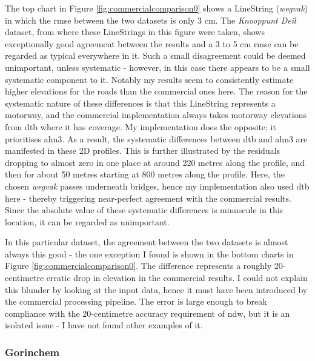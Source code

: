 The top chart in Figure \ref{fig:commercialcomparison0} shows a LineString (\textit{wegvak}) in which the \ac{rmse} between the two datasets is only 3 cm. The \textit{Knooppunt Deil} dataset, from where these LineStrings in this figure were taken, shows exceptionally good agreement between the results and a 3 to 5 cm \ac{rmse} can be regarded as typical everywhere in it. Such a small disagreement could be deemed unimportant, unless systematic - however, in this case there appears to be a small systematic component to it. Notably my results seem to consistently estimate higher elevations for the roads than the commercial ones here. The reason for the systematic nature of these differences is that this LineString represents a motorway, and the commercial implementation always takes motorway elevations from \ac{dtb} where it has coverage. My implementation does the opposite; it prioritises \ac{ahn3}. As a result, the systematic differences between \ac{dtb} and \ac{ahn3} are manifested in these 2D profiles. This is further illustrated by the residuals dropping to almost zero in one place at around 220 metres along the profile, and then for about 50 metres starting at 800 metres along the profile. Here, the chosen \textit{wegvak} passes underneath bridges, hence my implementation also used \ac{dtb} here - thereby triggering near-perfect agreement with the commercial results. Since the absolute value of these systematic differences is minuscule in this location, it can be regarded as unimportant.

In this particular dataset, the agreement between the two datasets is almost always this good - the one exception I found is shown in the bottom charts in Figure \ref{fig:commercialcomparison0}. The difference represents a roughly 20-centimetre erratic drop in elevation in the commercial results. I could not explain this blunder by looking at the input data, hence it must have been introduced by the commercial processing pipeline. The error is large enough to break compliance with the 20-centimetre accuracy requirement of \ac{ndw}, but it is an isolated issue - I have not found other examples of it.

\subsubsection{Gorinchem}

